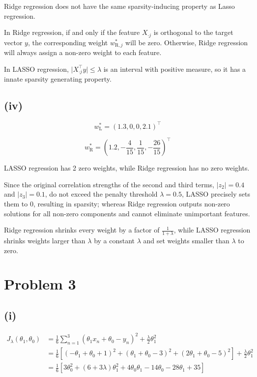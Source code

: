 \documentclass[11pt]{article}
\begin{document}
Ridge regression does not have the same sparsity-inducing property as Lasso regression.

In Ridge regression, if and only if the feature $X_{\cdot j}$ is orthogonal to the target vector $y$, the corresponding weight $w_{\text{R}, j}^*$ will be zero. Otherwise, Ridge regression will always assign a non-zero weight to each feature.

In LASSO regression, $\vert X_{\cdot j}^\top y \vert \le \lambda$ is an interval with positive measure, so it has a innate sparsity generating property.

\subsection*{(iv)}

$$
w_{\text{L}}^* = (1.3, 0, 0, 2.1)^\top
$$

$$
w_{\text{R}}^*
= \left(1.2, -\frac{4}{15}, \frac{1}{15}, -\frac{26}{15}\right)^\top
$$

LASSO regression has 2 zero weights, while Ridge regression has no zero weights.

Since the original correlation strengths of the second and third terms, $\vert z_2\vert  = 0.4$ and $\vert z_3\vert  = 0.1$, do not exceed the penalty threshold $\lambda = 0.5$, LASSO precisely sets them to 0, resulting in sparsity; whereas Ridge regression outputs non-zero solutions for all non-zero components and cannot eliminate unimportant features.

Ridge regression shrinks every weight by a factor of $\frac{1}{1 + \lambda}$, while LASSO regression shrinks weights larger than $\lambda$ by a constant $\lambda$ and set weights smaller than $\lambda$ to zero.

\newpage

\section*{Problem 3}

\subsection*{(i)}

$$
\begin{aligned}
J_\lambda(\theta_1, \theta_0)
&= \frac{1}{6} \sum_{n=1}^3 (\theta_1 x_n + \theta_0 - y_n)^2 + \frac{\lambda}{2}\theta_1^2 \\
&= \frac{1}{6} \left[ (-\theta_1 + \theta_0 + 1)^2 + (\theta_1 + \theta_0 - 3)^2 + (2\theta_1 + \theta_0 - 5)^2 \right] + \frac{\lambda}{2}\theta_1^2 \\
&= \frac{1}{6}\left[ 3\theta_0^2 + (6 + 3\lambda)\theta_1^2 + 4\theta_0\theta_1 - 14\theta_0 - 28\theta_1 + 35 \right]
\end{aligned}
$$
\end{document}
